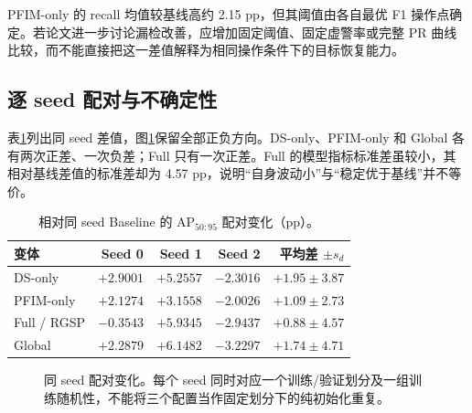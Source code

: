 \documentclass[UTF8,11pt,a4paper,fontset=fandol]{ctexart}
\newcommand{\ap}{\mathrm{AP}}
\begin{document}
PFIM-only 的 recall 均值较基线高约 2.15 pp，但其阈值由各自最优 F1 操作点确定。若论文进一步讨论漏检改善，应增加固定阈值、固定虚警率或完整 PR 曲线比较，而不能直接把这一差值解释为相同操作条件下的目标恢复能力。

\subsection{逐 seed 配对与不确定性}
表\ref{tab:paired}列出同 seed 差值，图\ref{fig:paired}保留全部正负方向。DS-only、PFIM-only 和 Global 各有两次正差、一次负差；Full 只有一次正差。Full 的模型指标标准差虽较小，其相对基线差值的标准差却为 4.57 pp，说明“自身波动小”与“稳定优于基线”并不等价。

\begin{table}[!htbp]\centering\small
\caption{相对同 seed Baseline 的 $\ap_{50:95}$ 配对变化（pp）。}
\label{tab:paired}
\begin{tabular}{lrrrr}
\toprule
变体 & Seed 0 & Seed 1 & Seed 2 & 平均差 $\pm s_d$\\
\midrule
DS-only & $+2.9001$ & $+5.2557$ & $-2.3016$ & $+1.95\pm3.87$\\
PFIM-only & $+2.1274$ & $+3.1558$ & $-2.0026$ & $+1.09\pm2.73$\\
Full / RGSP & $-0.3543$ & $+5.9345$ & $-2.9437$ & $+0.88\pm4.57$\\
Global & $+2.2879$ & $+6.1482$ & $-3.2297$ & $+1.74\pm4.71$\\
\bottomrule
\end{tabular}
\end{table}

\begin{figure}[tbp]\centering
{}
\caption{同 seed 配对变化。每个 seed 同时对应一个训练/验证划分及一组训练随机性，不能将三个配置当作固定划分下的纯初始化重复。}
\label{fig:paired}
\end{figure}
\end{document}
